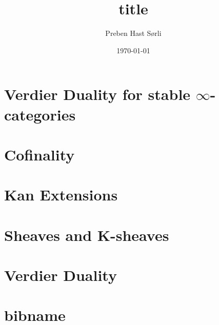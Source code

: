 \documentclass[british,titlepage]{ntnuthesis}
\title{title}
\author{Preben Hast Sørli}
\date{\today}
\begin{document}
\tableofcontents
\listoftodos
\chapter{Verdier Duality for stable $\infty$-categories}

\chapter{Cofinality}

\chapter{Kan Extensions}

\chapter{Sheaves and K-sheaves}

\chapter{Verdier Duality}

\chapter*{bibname}
\printbibliography[heading=none]
\end{document}
